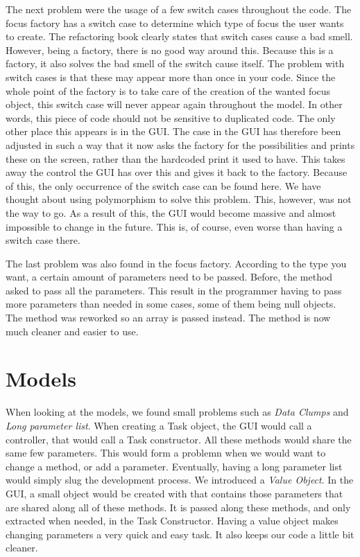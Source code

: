 The next problem were the usage of a few switch cases throughout the code. The focus factory has a switch case to determine which type of focus the user wants to create. The refactoring book clearly states that switch cases cause a bad smell. However, being a factory, there is no good way around this. Because this is a factory, it also solves the bad smell of the switch cause itself. The problem with switch cases is that these may appear more than once in your code. Since the whole point of the factory is to take care of the creation of the wanted focus object, this switch case will never appear again throughout the model.  In other words, this piece of code should not be sensitive to duplicated code. The only other place this appears is in the GUI. The case in the GUI has therefore been adjusted in such a way that it now asks the factory for the possibilities and prints these on the screen, rather than the hardcoded print it used to have. This takes away the control the GUI has over this and gives it back to the factory. Because of this, the only occurrence of the switch case can be found here. 
We have thought about using polymorphism to solve this problem. This, however, was not the way to go. As a result of this, the GUI would become massive and almost impossible to change in the future. This is, of course, even worse than having a switch case there.

The last problem was also found in the focus factory. According to the type you want, a certain amount of parameters need to be passed. Before, the method asked to pass all the parameters. This result in the programmer having to pass more parameters than needed in some cases, some of them being null objects. The method was reworked so an array is passed instead. The method is now much cleaner and easier to use.

\section{Models}
When looking at the models, we found small problems such as \emph{Data Clumps}
and \emph{Long parameter list}.
When creating a Task object, the GUI would call a controller, that would call a
Task constructor. All these methods would
share the same few parameters.
This would form a problemn when we would want to change a method, or add a
parameter. Eventually, having a long parameter list would simply slug the
development process.
We introduced a \emph{Value Object}. In the GUI, a small object would be created
with that contains those parameters that are shared along all of these methods.
It is passed along these methods, and only extracted when needed, in the Task
Constructor.
Having a value object makes changing parameters a very quick and easy task. It
also keeps our code a little bit cleaner.

